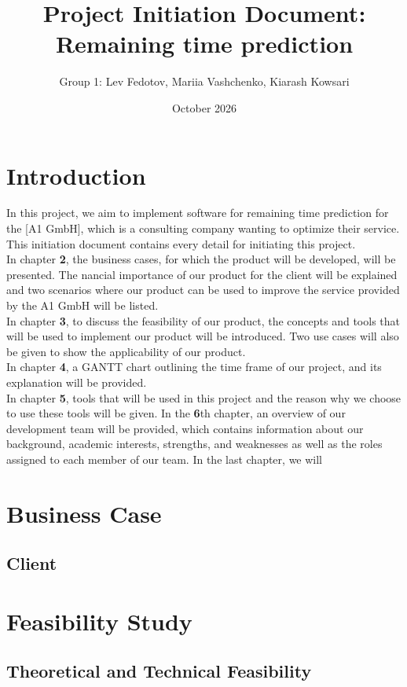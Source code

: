 \documentclass[12pt]{article}
\begin{document}
\title{Project Initiation Document: Remaining time prediction}
\author{Group 1: Lev Fedotov, Mariia Vashchenko, Kiarash Kowsari}
\date{October 2026}
\maketitle
\pagebreak
\tableofcontents
\section{Introduction}
In this project, we aim to implement software for remaining time prediction for the [A1 GmbH], which is a consulting
company wanting to optimize their service. This initiation document contains
every detail for initiating this project. \\
In chapter \textbf{2}, the business cases, for which the product will be developed, will
be presented. The nancial importance of our product for the client will be
explained and two scenarios where our product can be used to improve the
service provided by the A1 GmbH will be listed. \\ 
In chapter \textbf{3}, to discuss the feasibility of our product, the concepts and tools
that will be used to implement our product will be introduced. Two use cases
will also be given to show the applicability of our product. \\
In chapter \textbf{4}, a GANTT chart outlining the time frame of our project, and its
explanation will be provided. \\ 
In chapter \textbf{5}, tools that will be used in this project and the reason why we
choose to use these tools will be given.
In the \textbf{6}th chapter, an overview of our development team will be provided, which
contains information about our background, academic interests, strengths, and
weaknesses as well as the roles assigned to each member of our team.
In the last chapter, we will  
\section{Business Case}
\subsection{Client}
\section{Feasibility Study}
\subsection{Theoretical and Technical Feasibility}
\end{document}
